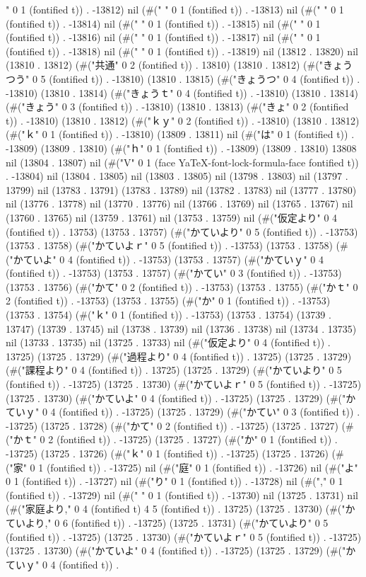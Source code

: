 " 0 1 (fontified t)) . -13812) nil (#("	" 0 1 (fontified t)) . -13813) nil (#("	" 0 1 (fontified t)) . -13814) nil (#(" " 0 1 (fontified t)) . -13815) nil (#(" " 0 1 (fontified t)) . -13816) nil (#(" " 0 1 (fontified t)) . -13817) nil (#(" " 0 1 (fontified t)) . -13818) nil (#(" " 0 1 (fontified t)) . -13819) nil (13812 . 13820) nil (13810 . 13812) (#("共通" 0 2 (fontified t)) . 13810) (13810 . 13812) (#("きょうつう" 0 5 (fontified t)) . -13810) (13810 . 13815) (#("きょうつ" 0 4 (fontified t)) . -13810) (13810 . 13814) (#("きょうｔ" 0 4 (fontified t)) . -13810) (13810 . 13814) (#("きょう" 0 3 (fontified t)) . -13810) (13810 . 13813) (#("きょ" 0 2 (fontified t)) . -13810) (13810 . 13812) (#("ｋｙ" 0 2 (fontified t)) . -13810) (13810 . 13812) (#("ｋ" 0 1 (fontified t)) . -13810) (13809 . 13811) nil (#("は" 0 1 (fontified t)) . -13809) (13809 . 13810) (#("ｈ" 0 1 (fontified t)) . -13809) (13809 . 13810) 13808 nil (13804 . 13807) nil (#("V" 0 1 (face YaTeX-font-lock-formula-face fontified t)) . -13804) nil (13804 . 13805) nil (13803 . 13805) nil (13798 . 13803) nil (13797 . 13799) nil (13783 . 13791) (13783 . 13789) nil (13782 . 13783) nil (13777 . 13780) nil (13776 . 13778) nil (13770 . 13776) nil (13766 . 13769) nil (13765 . 13767) nil (13760 . 13765) nil (13759 . 13761) nil (13753 . 13759) nil (#("仮定より" 0 4 (fontified t)) . 13753) (13753 . 13757) (#("かていより" 0 5 (fontified t)) . -13753) (13753 . 13758) (#("かていよｒ" 0 5 (fontified t)) . -13753) (13753 . 13758) (#("かていよ" 0 4 (fontified t)) . -13753) (13753 . 13757) (#("かていｙ" 0 4 (fontified t)) . -13753) (13753 . 13757) (#("かてい" 0 3 (fontified t)) . -13753) (13753 . 13756) (#("かて" 0 2 (fontified t)) . -13753) (13753 . 13755) (#("かｔ" 0 2 (fontified t)) . -13753) (13753 . 13755) (#("か" 0 1 (fontified t)) . -13753) (13753 . 13754) (#("ｋ" 0 1 (fontified t)) . -13753) (13753 . 13754) (13739 . 13747) (13739 . 13745) nil (13738 . 13739) nil (13736 . 13738) nil (13734 . 13735) nil (13733 . 13735) nil (13725 . 13733) nil (#("仮定より" 0 4 (fontified t)) . 13725) (13725 . 13729) (#("過程より" 0 4 (fontified t)) . 13725) (13725 . 13729) (#("課程より" 0 4 (fontified t)) . 13725) (13725 . 13729) (#("かていより" 0 5 (fontified t)) . -13725) (13725 . 13730) (#("かていよｒ" 0 5 (fontified t)) . -13725) (13725 . 13730) (#("かていよ" 0 4 (fontified t)) . -13725) (13725 . 13729) (#("かていｙ" 0 4 (fontified t)) . -13725) (13725 . 13729) (#("かてい" 0 3 (fontified t)) . -13725) (13725 . 13728) (#("かて" 0 2 (fontified t)) . -13725) (13725 . 13727) (#("かｔ" 0 2 (fontified t)) . -13725) (13725 . 13727) (#("か" 0 1 (fontified t)) . -13725) (13725 . 13726) (#("ｋ" 0 1 (fontified t)) . -13725) (13725 . 13726) (#("家" 0 1 (fontified t)) . -13725) nil (#("庭" 0 1 (fontified t)) . -13726) nil (#("よ" 0 1 (fontified t)) . -13727) nil (#("り" 0 1 (fontified t)) . -13728) nil (#("," 0 1 (fontified t)) . -13729) nil (#(" " 0 1 (fontified t)) . -13730) nil (13725 . 13731) nil (#("家庭より," 0 4 (fontified t) 4 5 (fontified t)) . 13725) (13725 . 13730) (#("かていより," 0 6 (fontified t)) . -13725) (13725 . 13731) (#("かていより" 0 5 (fontified t)) . -13725) (13725 . 13730) (#("かていよｒ" 0 5 (fontified t)) . -13725) (13725 . 13730) (#("かていよ" 0 4 (fontified t)) . -13725) (13725 . 13729) (#("かていｙ" 0 4 (fontified t)) . 